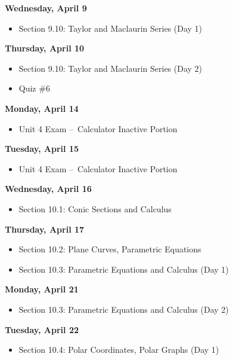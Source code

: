 \documentclass[11pt]{article}
\begin{document}
\textbf{Wednesday, April 9}

\begin{itemize}
\item Section 9.10: Taylor and Maclaurin Series (Day 1)
\end{itemize}

\textbf{Thursday, April 10}

\begin{itemize}
\item Section 9.10: Taylor and Maclaurin Series (Day 2)
\item Quiz \#6
\end{itemize}

\textbf{Monday, April 14}

\begin{itemize}
\item Unit 4 Exam --~Calculator Inactive Portion
\end{itemize}

\textbf{Tuesday, April 15}

\begin{itemize}
\item Unit 4 Exam --~Calculator Inactive Portion
\end{itemize}

\textbf{Wednesday, April 16}

\begin{itemize}
\item Section 10.1: Conic Sections and Calculus
\end{itemize}

\textbf{Thursday, April 17}

\begin{itemize}
\item Section 10.2: Plane Curves, Parametric Equations
\item Section 10.3: Parametric Equations and Calculus (Day 1)
\end{itemize}

\textbf{Monday, April 21}

\begin{itemize}
\item Section 10.3: Parametric Equations and Calculus (Day 2)
\end{itemize}

\textbf{Tuesday, April 22}

\begin{itemize}
\item Section 10.4: Polar Coordinates, Polar Graphs (Day 1)
\end{itemize}
\end{document}
